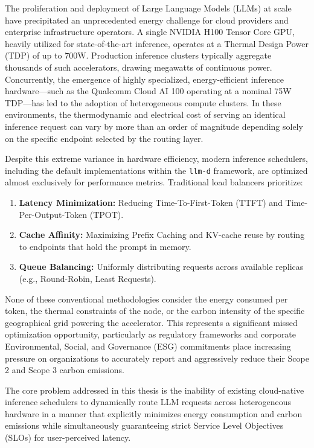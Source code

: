 \documentclass[12pt,a4paper,oneside]{report}
\begin{document}
The proliferation and deployment of Large Language Models (LLMs) at scale have precipitated an unprecedented energy challenge for cloud providers and enterprise infrastructure operators. A single NVIDIA H100 Tensor Core GPU, heavily utilized for state-of-the-art inference, operates at a Thermal Design Power (TDP) of up to 700W. Production inference clusters typically aggregate thousands of such accelerators, drawing megawatts of continuous power. Concurrently, the emergence of highly specialized, energy-efficient inference hardware—such as the Qualcomm Cloud AI 100 operating at a nominal 75W TDP—has led to the adoption of heterogeneous compute clusters. In these environments, the thermodynamic and electrical cost of serving an identical inference request can vary by more than an order of magnitude depending solely on the specific endpoint selected by the routing layer.


Despite this extreme variance in hardware efficiency, modern inference schedulers, including the default implementations within the \texttt{llm-d} framework, are optimized almost exclusively for performance metrics. Traditional load balancers prioritize:
\begin{enumerate}
    \item \textbf{Latency Minimization:} Reducing Time-To-First-Token (TTFT) and Time-Per-Output-Token (TPOT).
    \item \textbf{Cache Affinity:} Maximizing Prefix Caching and KV-cache reuse by routing to endpoints that hold the prompt in memory.
    \item \textbf{Queue Balancing:} Uniformly distributing requests across available replicas (e.g., Round-Robin, Least Requests).
\end{enumerate}

None of these conventional methodologies consider the energy consumed per token, the thermal constraints of the node, or the carbon intensity of the specific geographical grid powering the accelerator. This represents a significant missed optimization opportunity, particularly as regulatory frameworks and corporate Environmental, Social, and Governance (ESG) commitments place increasing pressure on organizations to accurately report and aggressively reduce their Scope 2 and Scope 3 carbon emissions.

The core problem addressed in this thesis is the inability of existing cloud-native inference schedulers to dynamically route LLM requests across heterogeneous hardware in a manner that explicitly minimizes energy consumption and carbon emissions while simultaneously guaranteeing strict Service Level Objectives (SLOs) for user-perceived latency. 
\end{document}
